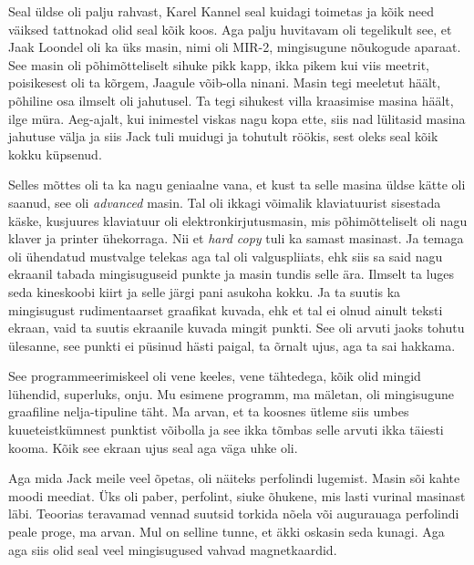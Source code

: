 Seal üldse oli palju rahvast, Karel Kannel seal kuidagi toimetas ja kõik need väiksed tattnokad olid seal kõik koos. Aga palju huvitavam oli tegelikult see, et Jaak Loondel oli ka üks masin, nimi oli MIR-2, mingisugune nõukogude aparaat. See masin oli põhimõtteliselt sihuke pikk kapp, ikka pikem kui viis meetrit, poisikesest oli ta kõrgem, Jaagule võib-olla ninani. Masin tegi meeletut häält, põhiline osa ilmselt oli jahutusel. Ta tegi sihukest villa kraasimise masina häält, ilge müra. Aeg-ajalt, kui inimestel viskas nagu kopa ette, siis nad lülitasid masina jahutuse välja ja siis Jack tuli muidugi ja tohutult röökis, sest oleks seal kõik kokku küpsenud. 

Selles mõttes oli ta ka nagu geniaalne vana, et kust ta selle masina üldse kätte oli saanud, see oli \emph{advanced} masin. Tal oli ikkagi võimalik klaviatuurist sisestada käske, kusjuures klaviatuur oli elektronkirjutusmasin, mis  põhimõtteliselt oli nagu klaver ja printer ühekorraga. Nii et \emph{hard copy} tuli ka samast masinast. Ja temaga oli ühendatud mustvalge telekas aga tal oli valguspliiats,  ehk siis sa said nagu ekraanil tabada mingisuguseid punkte ja  masin tundis selle ära. Ilmselt ta luges seda  kineskoobi kiirt ja selle järgi pani asukoha kokku. Ja ta suutis ka mingisugust rudimentaarset graafikat kuvada, ehk et tal ei olnud ainult teksti ekraan, vaid ta suutis ekraanile kuvada mingit punkti. See oli arvuti jaoks tohutu ülesanne, see punkti ei püsinud hästi paigal, ta õrnalt ujus, aga ta sai hakkama. 

See programmeerimiskeel oli vene keeles, vene tähtedega, kõik olid mingid lühendid, superluks, onju. Mu esimene programm, ma mäletan, oli mingisugune graafiline nelja-tipuline täht. Ma arvan, et ta koosnes ütleme siis  umbes kuueteistkümnest punktist võibolla ja see ikka tõmbas selle arvuti ikka täiesti kooma. Kõik see ekraan ujus seal aga väga uhke oli. 

Aga mida Jack meile veel õpetas, oli näiteks perfolindi lugemist. Masin sõi kahte moodi meediat. Üks oli paber, perfolint, siuke õhukene, mis lasti vurinal masinast läbi. Teoorias teravamad vennad suutsid torkida nõela või augurauaga  perfolindi peale proge, ma arvan. Mul on selline tunne, et äkki oskasin seda kunagi. Aga aga siis olid seal veel mingisugused vahvad magnetkaardid. 

